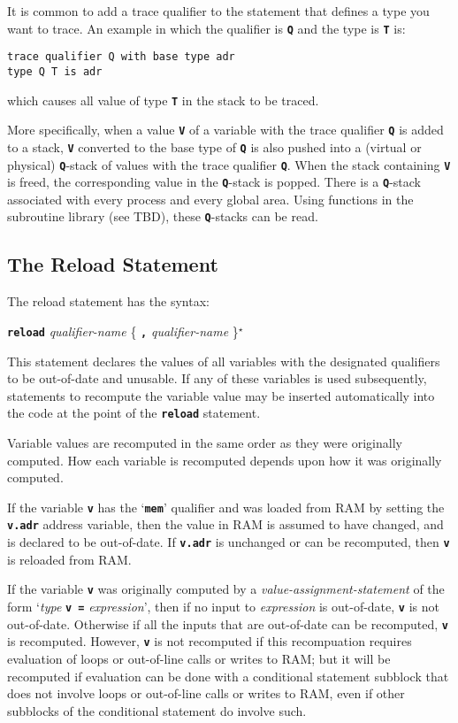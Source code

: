\documentclass[12pt]{article}
\makeatletter
\newcommand{\TT}[1]{{\tt \bfseries #1}}
\newcommand{\ttkey}[1]{\TT{#1}\index{#1@{\tt #1}}}
\newcommand{\STAR}{{\Large $^\star$}}
\newenvironment{indpar}[1][0.3in]%
	{\begin{list}{}%
		     {\setlength{\itemsep}{0in}%
		      \setlength{\topsep}{0in}%
		      \setlength{\parsep}{1ex}%
		      \setlength{\labelwidth}{#1}%
		      \setlength{\leftmargin}{#1}%
		      \addtolength{\leftmargin}{\labelsep}}%
	 \item}%
	{\end{list}}
\makeatother
\begin{document}
It is common to add a trace qualifier to the statement that
defines a type you want to trace.  An example in which the
qualifier is \TT{Q} and the type is \TT{T} is:
\begin{indpar}\begin{verbatim}
trace qualifier Q with base type adr
type Q T is adr
\end{verbatim}\end{indpar}
which causes all value of type \TT{T} in the stack to be
traced.

More specifically, when a value \TT{V} of a variable with the trace
qualifier \TT{Q} is added to a stack, \TT{V} converted to the
base type of \TT{Q} is also
pushed into a (virtual or physical) \TT{Q}-stack of values with
the trace qualifier \TT{Q}.
When the stack containing \TT{V} is freed, the corresponding
value in the \TT{Q}-stack is popped.  There is a \TT{Q}-stack
associated with every process and every global area.
Using functions in the
subroutine library (see TBD), these \TT{Q}-stacks can be read.

\subsection{The Reload Statement}
\label{THE-RELOAD-COMMAND}

The reload statement has the syntax:
\begin{center}
\ttkey{reload} {\em qualifier-name} \{ \TT{,} {\em qualifier-name} \}\STAR{}
\end{center}

This statement declares the values of all variables with the designated
qualifiers to be out-of-date and unusable.  If any of these variables
is used subsequently, statements to recompute the variable value
may be inserted automatically into the code at the point of the
\TT{reload} statement.

Variable values are recomputed in the same order as they were
originally computed.  How each variable is recomputed depends upon
how it was originally computed.

If the variable \TT{v} has the `\TT{mem}' qualifier and was loaded
from RAM by setting the \TT{v.adr} address variable, then the value
in RAM is assumed to have changed, and is declared to be out-of-date.
If \TT{v.adr} is unchanged or
can be recomputed, then \TT{v} is reloaded from RAM.

If the variable \TT{v} was originally computed by
a {\em value-assignment-statement}
of the form `{\em type} \TT{v =} {\em expression}', then if
no input to {\em expression} is out-of-date, \TT{v} is not out-of-date.
Otherwise if all the inputs that are out-of-date can be recomputed,
\TT{v} is recomputed.  However, \TT{v} is not recomputed if this
recompuation requires evaluation of loops or out-of-line calls or
writes to RAM;
but it will be recomputed if evaluation can be done with a conditional
statement subblock that does not involve loops or out-of-line calls or
writes to RAM,
even if other subblocks of the conditional statement do involve such.
\end{document}
